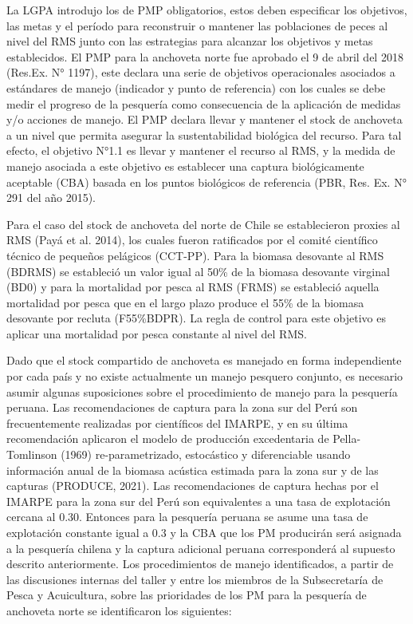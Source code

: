 
La LGPA introdujo los de PMP obligatorios, estos deben especificar los objetivos, las metas y el período para reconstruir o mantener las poblaciones de peces al nivel del RMS junto con las estrategias para alcanzar los objetivos y metas establecidos. El PMP para la anchoveta norte fue aprobado el 9 de abril del 2018 (Res.Ex. N° 1197), este declara una serie de objetivos operacionales asociados a estándares de manejo (indicador y punto de referencia) con los cuales se debe medir el progreso de la pesquería como consecuencia de la aplicación de medidas y/o acciones de manejo. El PMP declara llevar y mantener el stock de anchoveta a un nivel que permita asegurar la sustentabilidad biológica del recurso. Para tal efecto, el objetivo N°1.1 es llevar y mantener el recurso al RMS, y la medida de manejo asociada a este objetivo es establecer una captura biológicamente aceptable (CBA) basada en los puntos biológicos de referencia (PBR, Res. Ex. N° 291 del año 2015).
\newline

Para el caso del stock de anchoveta del norte de Chile se establecieron proxies al RMS (Payá et al. 2014), los cuales fueron ratificados por el comité científico técnico de pequeños pelágicos (CCT-PP). Para la biomasa desovante al RMS (BDRMS) se estableció un valor igual al 50\% de la biomasa desovante virginal (BD0) y para la mortalidad por pesca al RMS (FRMS) se estableció aquella mortalidad por pesca que en el largo plazo produce el 55\% de la biomasa desovante por recluta (F55\%BDPR). La regla de control para este objetivo es aplicar una mortalidad por pesca constante al nivel del RMS.
\newline

Dado que el stock compartido de anchoveta es manejado en forma independiente por cada país y no existe actualmente un manejo pesquero conjunto, es necesario asumir algunas suposiciones sobre el procedimiento de manejo para la pesquería peruana. Las recomendaciones de captura para la zona sur del Perú son frecuentemente realizadas por científicos del IMARPE, y en su última recomendación aplicaron el modelo de producción excedentaria de Pella-Tomlinson (1969) re-parametrizado, estocástico y diferenciable usando información anual de la biomasa acústica estimada para la zona sur y de las capturas (PRODUCE, 2021). Las recomendaciones de captura hechas por el IMARPE para la zona sur del Perú son equivalentes a una tasa de explotación cercana al 0.30. Entonces para la pesquería peruana se asume una tasa de explotación constante igual a 0.3 y la CBA que los PM producirán será asignada a la pesquería chilena y la captura adicional peruana corresponderá al supuesto descrito anteriormente. Los procedimientos de manejo identificados, a partir de las discusiones internas del taller y entre los miembros de la Subsecretaría de Pesca y Acuicultura, sobre las prioridades de los PM para la pesquería de anchoveta norte se identificaron los siguientes:  

